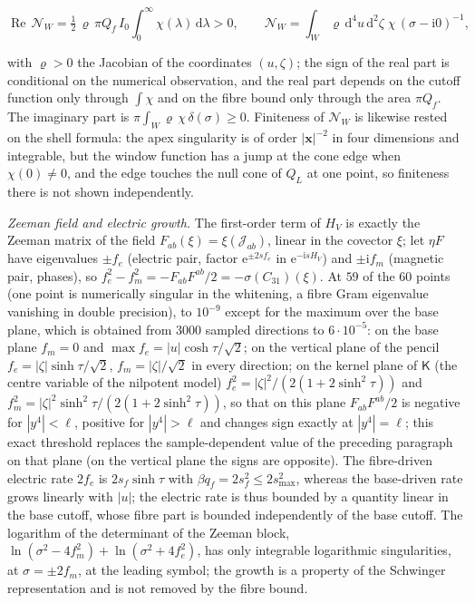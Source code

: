 \[

  \operatorname{Re}\,\mathcal N_W=\tfrac12\,\varrho\,\pi Q_f\,I_0\int_0^\infty\chi(\lambda)\,\mathrm d\lambda>0 ,\qquad

  \mathcal N_W=\int_W\varrho\,\mathrm d^4u\,\mathrm d^2\zeta\;\chi\,(\sigma-\mathrm i0)^{-1},

\]

with \(\varrho>0\) the Jacobian of the coordinates \((u,\zeta)\); the sign of the real part is conditional on the numerical observation, and the real part depends on the cutoff function only through \(\int\chi\) and on the fibre bound only through the area \(\pi Q_f\). The imaginary part is \(\pi\int_W\varrho\,\chi\,\delta(\sigma)\ge0\). Finiteness of \(\mathcal N_W\) is likewise rested on the shell formula: the apex singularity is of order \(|\boldsymbol x|^{-2}\) in four dimensions and integrable, but the window function has a jump at the cone edge when \(\chi(0)\ne0\), and the edge touches the null cone of \(Q_L\) at one point, so finiteness there is not shown independently.



\emph{Zeeman field and electric growth.} The first-order term of \(H_V\) is exactly the Zeeman matrix of the field \(F_{ab}(\xi)=\xi(\mathcal J_{ab})\), linear in the covector \(\xi\); let \(\eta F\) have eigenvalues \(\pm f_e\) (electric pair, factor \(\mathrm e^{\pm2sf_e}\) in \(\mathrm e^{-\mathrm isH_V}\)) and \(\pm\mathrm if_m\) (magnetic pair, phases), so \(f_e^2-f_m^2=-F_{ab}F^{ab}/2=-\sigma(C_{31})(\xi)\). At \(59\) of the \(60\) points (one point is numerically singular in the whitening, a fibre Gram eigenvalue vanishing in double precision), to \(10^{-9}\) except for the maximum over the base plane, which is obtained from \(3000\) sampled directions to \(6\cdot10^{-5}\): on the base plane \(f_m=0\) and \(\max f_e=|u|\cosh\tau/\sqrt2\); on the vertical plane of the pencil \(f_e=|\zeta|\sinh\tau/\sqrt2\), \(f_m=|\zeta|/\sqrt2\) in every direction; on the kernel plane of \(\mathsf K\) (the centre variable of the nilpotent model) \(f_e^2=|\zeta|^2/(2(1+2\sinh^2\tau))\) and \(f_m^2=|\zeta|^2\sinh^2\tau/(2(1+2\sinh^2\tau))\), so that on this plane \(F_{ab}F^{ab}/2\) is negative for \(|y^4|<\ell\), positive for \(|y^4|>\ell\) and changes sign exactly at \(|y^4|=\ell\); this exact threshold replaces the sample-dependent value of the preceding paragraph on that plane (on the vertical plane the signs are opposite). The fibre-driven electric rate \(2f_e\) is \(2s_f\sinh\tau\) with \(\beta q_f=2s_f^2\le2s_{\max}^2\), whereas the base-driven rate grows linearly with \(|u|\); the electric rate is thus bounded by a quantity linear in the base cutoff, whose fibre part is bounded independently of the base cutoff. The logarithm of the determinant of the Zeeman block, \(\ln(\sigma^2-4f_m^2)+\ln(\sigma^2+4f_e^2)\), has only integrable logarithmic singularities, at \(\sigma=\pm2f_m\), at the leading symbol; the growth is a property of the Schwinger representation and is not removed by the fibre bound.



